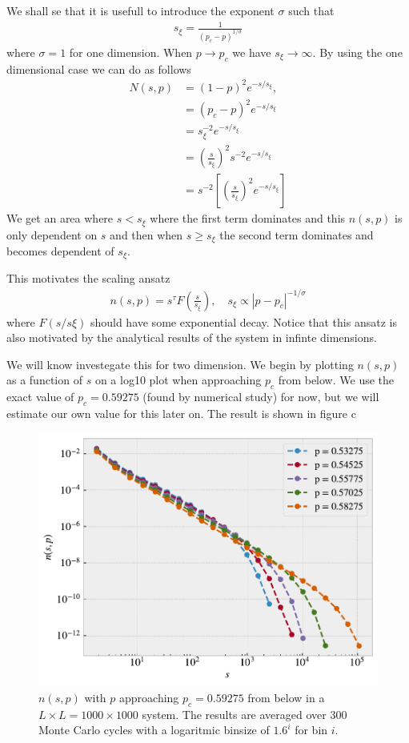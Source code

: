 \documentclass[reprint, amsmath, amssymb, aps]{revtex4-2}
\begin{document}
We shall se that it is usefull to introduce the exponent $\sigma$ such that
\begin{align*}
  s_\xi = \frac{1}{(p_c -p)^{1/\sigma}}
\end{align*}
where $\sigma = 1$ for one dimension. When $p \to p_c$ we have $s_\xi \to \infty$. By using the one dimensional case we can do as follows
\begin{align*}
  N(s,p) &= (1-p)^2e^{-s/s_\xi},  \\
  &= (p_c - p)^2 e^{-s/s_\xi} \\
  &= s_\xi^{-2} e^{-s/s_\xi} \\
  &= \left(\frac{s}{s_\xi}\right)^2s^{-2} e^{-s/s_\xi} \\
  &= s^{-2} \left[\left(\frac{s}{s_\xi}\right)^2e^{-s/s_\xi}\right]
\end{align*}
We get an area where $s < s_\xi$ where the first term dominates and this $n(s,p)$ is only dependent on $s$ and then when $s \ge s_\xi$ the second term dominates and becomes dependent of $s_\xi$. \par This motivates the scaling ansatz
\begin{align}
  n(s,p) = s^\tau F\left(\frac{s}{s_\xi}\right), \quad s_\xi \propto |p-p_c|^{-1/\sigma}
  \label{eq:scaling_ansatz}
\end{align}
where $F(s/s\xi)$ should have some exponential decay. Notice that this ansatz is also motivated by the analytical results of the system in infinte dimensions. \par
We will know investegate this for two dimension. We begin by plotting $n(s,p)$ as a function of $s$ on a log10 plot when approaching $p_c$ from below. We use the exact value of $p_c = 0.59275$ (found by numerical study) for now, but we will estimate our own value for this later on. The result is shown in figure c

\begin{figure}[H]
  \includegraphics[width=\linewidth]{figures/f_p_below.pdf}
  \caption{$n(s,p)$ with $p$ approaching $p_c = 0.59275$ from below in a $L \times L = 1000 \times 1000$ system. The results are averaged over 300 Monte Carlo cycles with a logaritmic binsize of $1.6^i$ for bin $i$.}
  \label{fig:f_below}
\end{figure}
\end{document}
